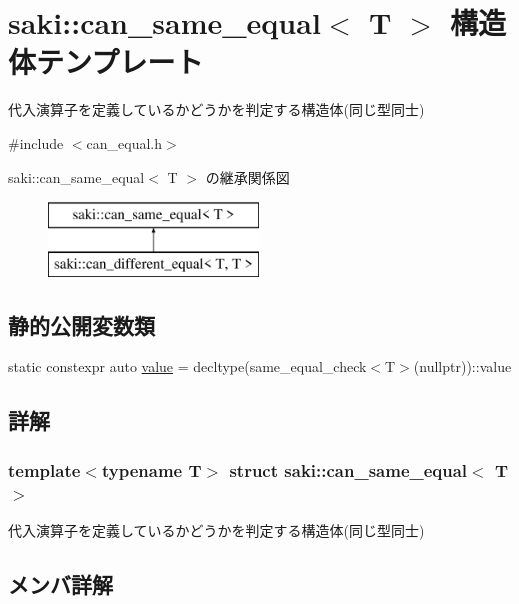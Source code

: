 \hypertarget{structsaki_1_1can__same__equal}{}\section{saki\+:\+:can\+\_\+same\+\_\+equal$<$ T $>$ 構造体テンプレート}
\label{structsaki_1_1can__same__equal}


代入演算子を定義しているかどうかを判定する構造体(同じ型同士)  




{\ttfamily \#include $<$can\+\_\+equal.\+h$>$}

saki\+:\+:can\+\_\+same\+\_\+equal$<$ T $>$ の継承関係図\begin{figure}[H]
\begin{center}
\leavevmode
\includegraphics[height=2.000000cm]{structsaki_1_1can__same__equal}
\end{center}
\end{figure}
\subsection*{静的公開変数類}
\begin{DoxyCompactItemize}
\item 
static constexpr auto \mbox{\hyperlink{structsaki_1_1can__same__equal_a7a0e40058e8b1b27113f7fee26fec91f}{value}} = decltype(same\+\_\+equal\+\_\+check$<$T$>$(nullptr))\+::value
\end{DoxyCompactItemize}


\subsection{詳解}
\subsubsection*{template$<$typename T$>$\newline
struct saki\+::can\+\_\+same\+\_\+equal$<$ T $>$}

代入演算子を定義しているかどうかを判定する構造体(同じ型同士) 

\subsection{メンバ詳解}
\mbox{\label{structsaki_1_1can__same__equal_a7a0e40058e8b1b27113f7fee26fec91f}} 
